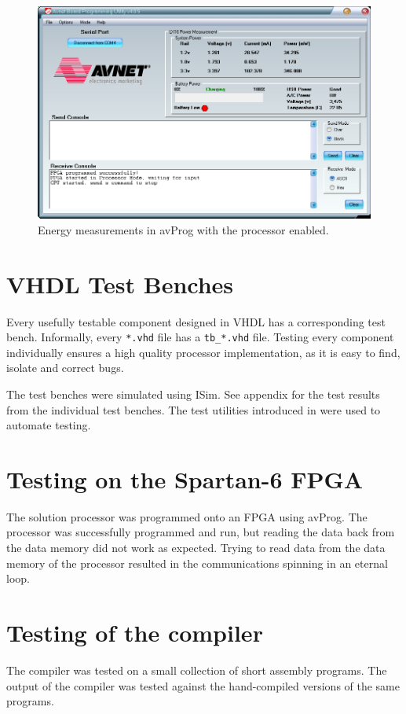 \begin{figure}[H]
\includegraphics[width=\textwidth]{illustrations/running.PNG}
\caption{Energy measurements in avProg with the processor enabled.}
\label{figure-avprog-energy-running}
\end{figure}

\section{VHDL Test Benches}

Every usefully testable component designed in VHDL has a corresponding test bench.
Informally, every \texttt{*.vhd} file has a \texttt{tb\_*.vhd} file.
Testing every component individually ensures a high quality processor implementation, as it is easy to find, isolate and correct bugs.

The test benches were simulated using ISim. See appendix  for the test results from the individual test benches. 
The test utilities introduced in \cite{assignment-1} were used to automate testing.

\section{Testing on the Spartan-6 FPGA}

The solution processor was programmed onto an FPGA using avProg.
The processor was successfully programmed and run, but reading the data back from the data memory did not work as expected.
Trying to read data from the data memory of the processor resulted in the communications spinning in an eternal loop.

\section{Testing of the compiler}

The compiler was tested on a small collection of short assembly programs.
The output of the compiler was tested against the hand-compiled versions of the same programs.
